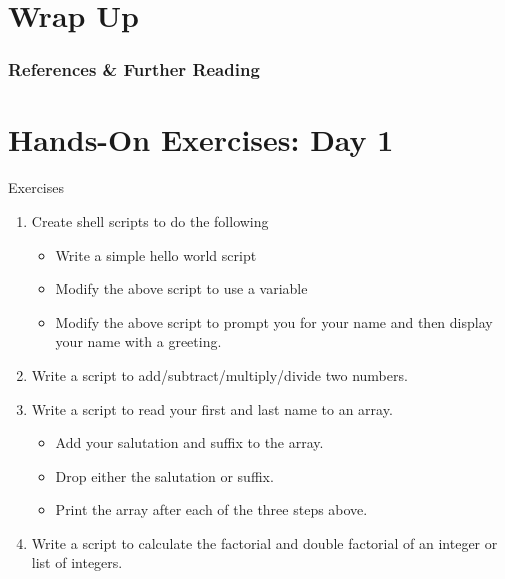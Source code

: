 \documentclass[10pt,t]{beamer}
\begin{document}
\section{Wrap Up}
\begin{frame}
  \frametitle{References \& Further Reading}
  \begin{itemize}
    \fontsize{7}{9}
  \end{itemize}
\end{frame}

\section{Hands-On Exercises: Day 1}
\begin{frame}{Exercises}
  \begin{enumerate}
    \item Create shell scripts to do the following
    \begin{itemize}
        \item Write a simple hello world script
        \item Modify the above script to use a variable
        \item Modify the above script to prompt you for your name and then display your name with a greeting.
    \end{itemize}
    \item Write a script to add/subtract/multiply/divide two numbers.
    \item Write a script to read your first and last name to an array.
    \begin{itemize}
      \item Add your salutation and suffix to the array.
      \item Drop either the salutation or suffix.
      \item Print the array after each of the three steps above.
    \end{itemize}
    \item Write a script to calculate the factorial and double factorial of an integer or list of integers.
  \end{enumerate}
\end{frame}
\end{document}
